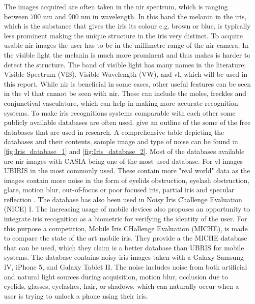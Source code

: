 The images acquired are often taken in the \gls{nir} spectrum, which is ranging between 700 nm and 900 nm in wavelength. In this band the melanin in the iris, which is the substance that gives the iris its colour e.g. brown or blue, is typically less prominent making the unique structure in the iris very distinct. To acquire usable \gls{nir} images the user has to be in the millimetre range of the \gls{nir} camera. In the visible light the melanin is much more prominent and thus makes is harder to detect the structure. The band of visible light has many names in the literature; Visible Spectrum (VIS), Visible Wavelength (VW), and \gls{vl}, which will be used  in this report. While \gls{nir} is beneficial in some cases, other useful features can be seen in the \gls{vl} that cannot be seen with \gls{nir}. These can include the moles, freckles and conjunctival vasculature, which can help in making more accurate recognition systems. To make iris recognitions systems comparable with each other some publicly available databases are often used. \cite{RifaeeMustafaandAbdallahMohammadandOkosh2017}  give an outline of the some of the free databases that are used in research. A comprehensive table depicting the databases and their contents, sample image and type of noise can be found in \autoref{fig:Iris_database_1} and \autoref{fig:Iris_database_2}. Most of the databases available are \gls{nir} images with CASIA being one of the most used database. For \gls{vl} images UBIRIS in the most commonly used. These contain more "real world" data as the images contain more noise in the form of eyelids obstruction, eyelash obstruction, glare, motion blur, out-of-focus or poor focused iris, partial iris and specular reflection \citep{Rattani2017}. The database has also been used in Noisy Iris Challenge Evaluation (NICE) I. The increasing usage of mobile devices also proposes an opportunity to integrate iris recognition as a biometric for verifying the identity of the user. For this purpose a competition, Mobile Iris CHallenge Evaluation (MICHE), is made to compare the state of the art mobile iris. They provide a the MICHE database that can be used, which they claim is a better database than UBRIS for mobile systems. The database contains noisy iris images taken with a Galaxy Samsung IV, iPhone 5, and Galaxy Tablet II. The noise includes noise from both artificial and natural light sources during acquisition, motion blur, occlusion due to eyelids, glasses, eyelashes, hair, or shadows, which can naturally occur when a user is trying to unlock a phone using their iris. 

